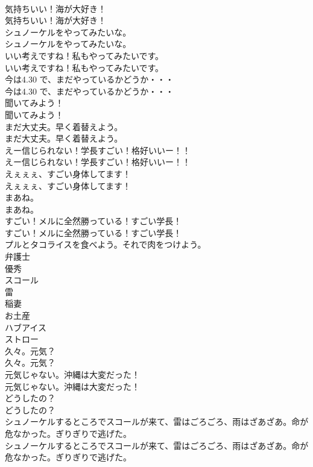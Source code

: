 \documentclass[8pt]{extreport}
\begin{document}
\begin{CJK}{UTF8}{min}
\\	気持ちいい！海が大好き！	
\\	気持ちいい！海が大好き！ 
\\	シュノーケルをやってみたいな。	
\\	シュノーケルをやってみたいな。 
\\	いい考えですね！私もやってみたいです。	
\\	いい考えですね！私もやってみたいです。 
\\	今は4.30 で、まだやっているかどうか・・・	
\\	今は4.30 で、まだやっているかどうか・・・ 
\\	聞いてみよう！	
\\	聞いてみよう！ 
\\	まだ大丈夫。早く着替えよう。	
\\	まだ大丈夫。早く着替えよう。 
\\	えー信じられない！学長すごい！格好いいー！！	
\\	えー信じられない！学長すごい！格好いいー！！ 
\\	えぇぇぇ、すごい身体してます！	
\\	えぇぇぇ、すごい身体してます！ 
\\	まあね。	
\\	まあね。 
\\	すごい！メルに全然勝っている！すごい学長！	
\\	すごい！メルに全然勝っている！すごい学長！ 
\\	プルとタコライスを食べよう。それで肉をつけよう。	
\\	弁護士
\\	優秀
\\	スコール
\\	雷
\\	稲妻
\\	お土産
\\	ハブアイス
\\	ストロー
\\	久々。元気？	
\\	久々。元気？ 
\\	元気じゃない。沖縄は大変だった！	
\\	元気じゃない。沖縄は大変だった！ 
\\	どうしたの？	
\\	どうしたの？ 
\\	シュノーケルするところでスコールが来て、雷はごろごろ、雨はざあざあ。命が危なかった。ぎりぎりで逃げた。	
\\	シュノーケルするところでスコールが来て、雷はごろごろ、雨はざあざあ。命が危なかった。ぎりぎりで逃げた。 

\end{CJK}
\end{document}
